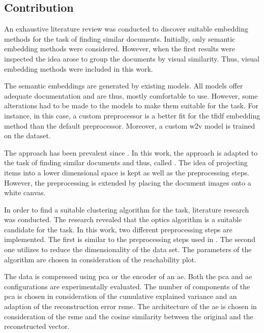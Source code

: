 \subsection{Contribution}\label{subsec:contribution}
An exhaustive literature review was conducted to discover suitable embedding methods for the task of finding similar documents.
Initially, only semantic embedding methods were considered.
However, when the first results were inspected the idea arose to group the documents by visual similarity.
Thus, visual embedding methods were included in this work.

The semantic embeddings are generated by existing models.
All models offer adequate documentation and are thus, mostly comfortable to use.
However, some alterations had to be made to the models to make them suitable for the task.
For instance, in this case, a custom preprocessor is a better fit for the \ac{tfidf} embedding method than the default preprocessor.
Moreover, a custom \ac{w2v} model is trained on the dataset.

The \eigenfaces{} approach has been prevalent since \citeyear{eigenfaces1991}.
In this work, the approach is adapted to the task of finding similar documents and thus, called \eigendocs{}.
The idea of projecting items into a lower dimensional space is kept as well as the preprocessing steps.
However, the preprocessing is extended by placing the document images onto a white canvas.


In order to find a suitable clustering algorithm for the task, literature research was conducted.
The research revealed that the \ac{optics} algorithm is a suitable candidate for the task.
In this work, two different preprocessing steps are implemented.
The first is similar to the preprocessing steps used in \cite{OPTICS1999}.
The second one utilizes \eigendocs{} to reduce the dimensionality of the data set.
The parameters of the algorithm are chosen in consideration of the reachability plot.


The data is compressed using \ac{pca} or the encoder of an \ac{ae}.
Both the \ac{pca} and \ac{ae} configurations are experimentally evaluated.
The number of components of the \ac{pca} is chosen in consideration of the cumulative explained variance 
and an adaption of the reconstruction error \ac{rsme}.
The architecture of the \ac{ae} is chosen in consideration of the \ac{rsme} and 
the cosine similarity between the original and the reconstructed vector.


